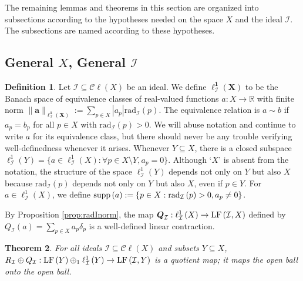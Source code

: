 \documentclass[12pt]{amsart}
\newtheorem{theorem}{Theorem}[section]
\theoremstyle{definition}
\newtheorem{definition}[theorem]{Definition}
\numberwithin{equation}{section}
\def \R {\mathbb{R}}
\def \I {\mathcal{I}}
\def \sbs {\subseteq}
\newcommand{\Cl}[1]{\mathcal{C}\ell\left(#1\right)}
\renewcommand{\l}[2]{\ell^1_{#1}\left( #2 \right)}
\newcommand{\rad}[2]{\mathrm{rad}_{#1}\left(#2\right)}
\begin{document}
\begin{figure}[omitted: a diagram of this paper's results, not reproduced here]\label{fig:lemmas}\end{figure}

The remaining lemmas and theorems in this section are organized into subsections according to the hypotheses needed on the space $X$ and the ideal $\I$. The subsections are named according to these hypotheses.

\subsection{General $X$, General $\I$}
\begin{definition}
Let $\I \sbs \Cl{X}$ be an ideal. We define $\boldsymbol{\l{\I}{X}}$ to be the Banach space of equivalence classes of real-valued functions $a: X \to \R$ with finite norm $\boldsymbol{\|a\|_{\l{\I}{X}}} := \sum_{p \in X} |a_p|\rad{\I}{p}$. The equivalence relation is $a \sim b$ if $a_p = b_p$ for all $p \in X$ with $\rad{\I}{p} > 0$. We will abuse notation and continue to write $a$ for its equivalence class, but there should never be any trouble verifying well-definedness whenever it arises. Whenever $Y \sbs X$, there is a closed subspace $\l{\I}{Y} = \{a \in \l{\I}{X}: \forall p \in X \setminus Y, a_p = 0\}$. Although `$X$' is absent from the notation, the structure of the space $\l{\I}{Y}$ depends not only on $Y$ but also $X$ because $\rad{\I}{p}$ depends not only on $Y$ but also $X$, even if $p \in Y$. For $a \in \l{\I}{X}$, we define $\supp{a} := \{p \in X: \rad{\I}{p} > 0, a_p \neq 0\}$.

By Proposition \ref{prop:radInorm}, the map $\boldsymbol{Q}_\I: \l{\I}{X} \to \LF{\I}{X}$ defined by $Q_\I(a) = \sum_{p \in X} a_p\delta_p$ is a well-defined linear contraction.
\end{definition}

\begin{theorem} \label{thm:quotient}
For all ideals $\I \sbs \Cl{X}$ and subsets $Y \sbs X$, $R_{\I} \oplus Q_{\I}: \LF{Y} \oplus_1 \l{\I}{Y} \to \LF{\I,Y}$ is a quotient map; it maps the open ball onto the open ball.
\end{theorem}
\end{document}
